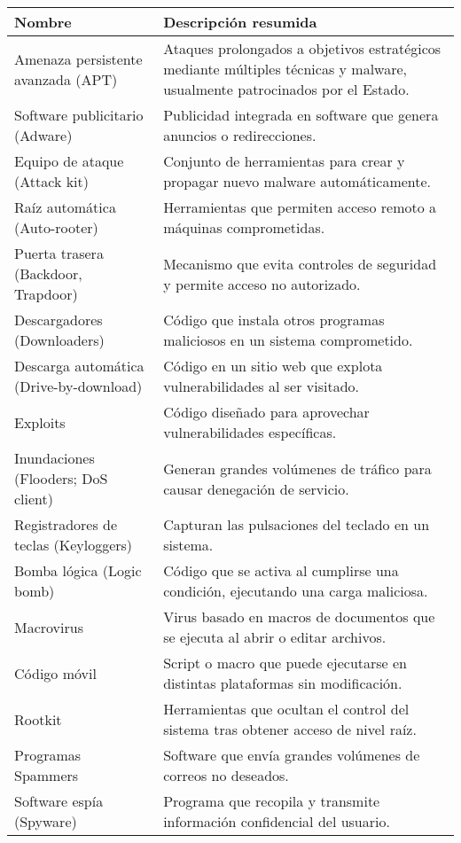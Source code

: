 \documentclass[11pt,a4paper]{article}
\begin{document}
\begin{table}[H]
\centering
\small
\begin{tabular}{|p{4cm}|p{10cm}|}
\hline
\textbf{Nombre} & \textbf{Descripción resumida} \\ \hline
Amenaza persistente avanzada (APT) & Ataques prolongados a objetivos estratégicos mediante múltiples técnicas y malware, usualmente patrocinados por el Estado. \\ \hline
Software publicitario (Adware) & Publicidad integrada en software que genera anuncios o redirecciones. \\ \hline
Equipo de ataque (Attack kit) & Conjunto de herramientas para crear y propagar nuevo malware automáticamente. \\ \hline
Raíz automática (Auto-rooter) & Herramientas que permiten acceso remoto a máquinas comprometidas. \\ \hline
Puerta trasera (Backdoor, Trapdoor) & Mecanismo que evita controles de seguridad y permite acceso no autorizado. \\ \hline
Descargadores (Downloaders) & Código que instala otros programas maliciosos en un sistema comprometido. \\ \hline
Descarga automática (Drive-by-download) & Código en un sitio web que explota vulnerabilidades al ser visitado. \\ \hline
Exploits & Código diseñado para aprovechar vulnerabilidades específicas. \\ \hline
Inundaciones (Flooders; DoS client) & Generan grandes volúmenes de tráfico para causar denegación de servicio. \\ \hline
Registradores de teclas (Keyloggers) & Capturan las pulsaciones del teclado en un sistema. \\ \hline
Bomba lógica (Logic bomb) & Código que se activa al cumplirse una condición, ejecutando una carga maliciosa. \\ \hline
Macrovirus & Virus basado en macros de documentos que se ejecuta al abrir o editar archivos. \\ \hline
Código móvil & Script o macro que puede ejecutarse en distintas plataformas sin modificación. \\ \hline
Rootkit & Herramientas que ocultan el control del sistema tras obtener acceso de nivel raíz. \\ \hline
Programas Spammers & Software que envía grandes volúmenes de correos no deseados. \\ \hline
Software espía (Spyware) & Programa que recopila y transmite información confidencial del usuario. \\ \hline

\end{tabular}
\end{table}
\end{document}

